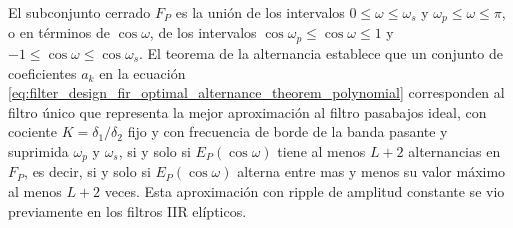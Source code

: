 \documentclass[a4paper]{report}
\begin{document}
El subconjunto cerrado \(F_P\) es la unión de los intervalos \(0\leq\omega\leq\omega_s\) y \(\omega_p\leq\omega\leq\pi\), o en términos de \(\cos\omega\), de los intervalos \(\cos\omega_p\leq \cos\omega\leq1\) y \(-1\leq \cos\omega\leq\cos\omega_s\). El teorema de la alternancia establece que un conjunto de coeficientes \(a_k\) en la ecuación \ref{eq:filter_design_fir_optimal_alternance_theorem_polynomial} corresponden al filtro único que representa la mejor aproximación al filtro pasabajos ideal, con cociente \(K=\delta_1/\delta_2\) fijo y con frecuencia de borde de la banda pasante y suprimida \(\omega_p\) y \(\omega_s\), si y solo si \(E_P(\cos\omega)\) tiene al menos \(L+2\) alternancias en \(F_P\), es decir, si y solo si \(E_P(\cos\omega)\) alterna entre mas y menos su valor máximo al menos \(L+2\) veces. Esta aproximación con ripple de amplitud constante se vio previamente en los filtros IIR elípticos.
\end{document}
